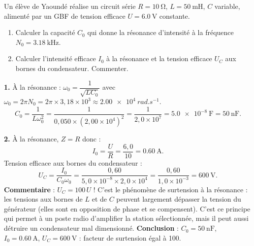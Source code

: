 \documentclass[11pt]{article}
\newcommand{\cle}[1]{{\popxbold\color{popdark}#1}}
\begin{document}
\begin{exoresolu}
Un élève de Yaoundé réalise un circuit série $R = \SI{10}{\ohm}$, $L = \SI{50}{\milli\henry}$, $C$ variable, alimenté par un GBF de tension efficace $U = \SI{6,0}{\volt}$ constante.
\begin{enumerate}
\item Calculer la capacité $C_0$ qui donne la résonance d'intensité à la fréquence $N_0 = \SI{3,18}{\kilo\hertz}$.
\item Calculer l'intensité efficace $I_0$ à la résonance et la tension efficace $U_C$ aux bornes du condensateur. Commenter.
\end{enumerate}
\tcblower
\textbf{1.} À la résonance : $\omega_0 = \dfrac{1}{\sqrt{LC_0}}$ avec $\omega_0 = 2\pi N_0 = 2\pi \times 3{,}18\times 10^{3} \approx \SI{2,00e4}{rad.s^{-1}}$.
\[ C_0 = \dfrac{1}{L\omega_0^{2}} = \dfrac{1}{0{,}050 \times (2{,}00\times 10^{4})^{2}} = \dfrac{1}{2{,}0\times 10^{7}} = \SI{5,0e-8}{\farad} = \SI{50}{\nano\farad}. \]

\textbf{2.} À la résonance, $Z = R$ donc :
\[ I_0 = \dfrac{U}{R} = \dfrac{6{,}0}{10} = \SI{0,60}{\ampere}. \]
Tension efficace aux bornes du condensateur :
\[ U_C = \dfrac{I_0}{C_0\omega_0} = \dfrac{0{,}60}{5{,}0\times 10^{-8}\times 2{,}0\times 10^{4}} = \dfrac{0{,}60}{1{,}0\times 10^{-3}} = \SI{600}{\volt}. \]
\textbf{Commentaire} : $U_C = 100\,U$ ! C'est le phénomène de \cle{surtension} à la résonance : les tensions aux bornes de $L$ et de $C$ peuvent largement dépasser la tension du générateur (elles sont en opposition de phase et se compensent). C'est ce principe qui permet à un poste radio d'amplifier la station sélectionnée, mais il peut aussi détruire un condensateur mal dimensionné.
\textbf{Conclusion} : $C_0 = \SI{50}{\nano\farad}$, $I_0 = \SI{0,60}{\ampere}$, $U_C = \SI{600}{\volt}$ : facteur de surtension égal à 100.
\end{exoresolu}
\end{document}
